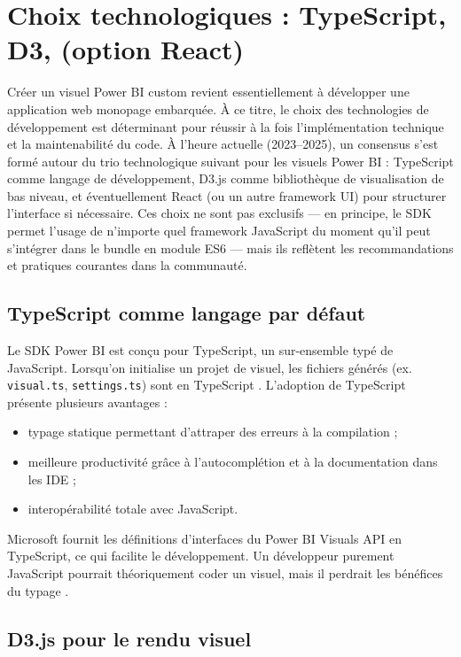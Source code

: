 \section{Choix technologiques : TypeScript, D3, (option React)}
\label{sec:technos}

Créer un visuel Power BI custom revient essentiellement à développer une application web monopage embarquée. À ce titre, le choix des technologies de développement est déterminant pour réussir à la fois l’implémentation technique et la maintenabilité du code. À l’heure actuelle (2023--2025), un consensus s’est formé autour du trio technologique suivant pour les visuels Power BI : TypeScript comme langage de développement, D3.js comme bibliothèque de visualisation de bas niveau, et éventuellement React (ou un autre framework UI) pour structurer l’interface si nécessaire. Ces choix ne sont pas exclusifs — en principe, le SDK permet l’usage de n’importe quel framework JavaScript du moment qu’il peut s’intégrer dans le bundle en module ES6 \cite{reddit-es6} — mais ils reflètent les recommandations et pratiques courantes dans la communauté.

\subsection{TypeScript comme langage par défaut}

Le SDK Power BI est conçu pour TypeScript, un sur-ensemble typé de JavaScript. Lorsqu’on initialise un projet de visuel, les fichiers générés (ex. \texttt{visual.ts}, \texttt{settings.ts}) sont en TypeScript \cite{ms-sdk-typescript}. L’adoption de TypeScript présente plusieurs avantages :
\begin{itemize}
  \item typage statique permettant d’attraper des erreurs à la compilation ;
  \item meilleure productivité grâce à l’autocomplétion et à la documentation dans les IDE ;
  \item interopérabilité totale avec JavaScript.
\end{itemize}
Microsoft fournit les définitions d’interfaces du Power BI Visuals API en TypeScript, ce qui facilite le développement. Un développeur purement JavaScript pourrait théoriquement coder un visuel, mais il perdrait les bénéfices du typage \cite{reddit-typescript-api}.

\subsection{D3.js pour le rendu visuel}

